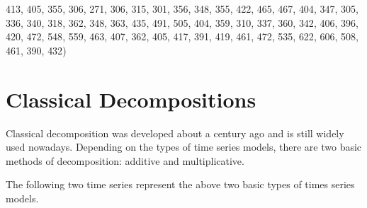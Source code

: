 \documentclass[
]{book}
\newenvironment{Shaded}{\begin{snugshade}}{\end{snugshade}}
\newcommand{\DecValTok}[1]{\textcolor[rgb]{0.00,0.00,0.81}{#1}}
\newcommand{\NormalTok}[1]{#1}
\begin{document}
\begin{Shaded}
\begin{Highlighting}[]
                \DecValTok{413}\NormalTok{, }\DecValTok{405}\NormalTok{, }\DecValTok{355}\NormalTok{, }\DecValTok{306}\NormalTok{, }\DecValTok{271}\NormalTok{, }\DecValTok{306}\NormalTok{, }\DecValTok{315}\NormalTok{, }\DecValTok{301}\NormalTok{, }\DecValTok{356}\NormalTok{, }\DecValTok{348}\NormalTok{, }\DecValTok{355}\NormalTok{, }\DecValTok{422}\NormalTok{, }\DecValTok{465}\NormalTok{, }\DecValTok{467}\NormalTok{, }\DecValTok{404}\NormalTok{, }
                \DecValTok{347}\NormalTok{, }\DecValTok{305}\NormalTok{, }\DecValTok{336}\NormalTok{, }\DecValTok{340}\NormalTok{, }\DecValTok{318}\NormalTok{, }\DecValTok{362}\NormalTok{, }\DecValTok{348}\NormalTok{, }\DecValTok{363}\NormalTok{, }\DecValTok{435}\NormalTok{, }\DecValTok{491}\NormalTok{, }\DecValTok{505}\NormalTok{, }\DecValTok{404}\NormalTok{, }\DecValTok{359}\NormalTok{, }\DecValTok{310}\NormalTok{, }\DecValTok{337}\NormalTok{, }
                \DecValTok{360}\NormalTok{, }\DecValTok{342}\NormalTok{, }\DecValTok{406}\NormalTok{, }\DecValTok{396}\NormalTok{, }\DecValTok{420}\NormalTok{, }\DecValTok{472}\NormalTok{, }\DecValTok{548}\NormalTok{, }\DecValTok{559}\NormalTok{, }\DecValTok{463}\NormalTok{, }\DecValTok{407}\NormalTok{, }\DecValTok{362}\NormalTok{, }\DecValTok{405}\NormalTok{, }\DecValTok{417}\NormalTok{, }\DecValTok{391}\NormalTok{, }\DecValTok{419}\NormalTok{,}
                \DecValTok{461}\NormalTok{, }\DecValTok{472}\NormalTok{, }\DecValTok{535}\NormalTok{, }\DecValTok{622}\NormalTok{, }\DecValTok{606}\NormalTok{, }\DecValTok{508}\NormalTok{, }\DecValTok{461}\NormalTok{, }\DecValTok{390}\NormalTok{, }\DecValTok{432}\NormalTok{)}
\end{Highlighting}
\end{Shaded}

\hypertarget{classical-decompositions}{%
\section{Classical Decompositions}\label{classical-decompositions}}

Classical decomposition was developed about a century ago and is still widely used nowadays. Depending on the types of time series models, there are two basic methods of decomposition: additive and multiplicative.

The following two time series represent the above two basic types of times series models.
\end{document}

